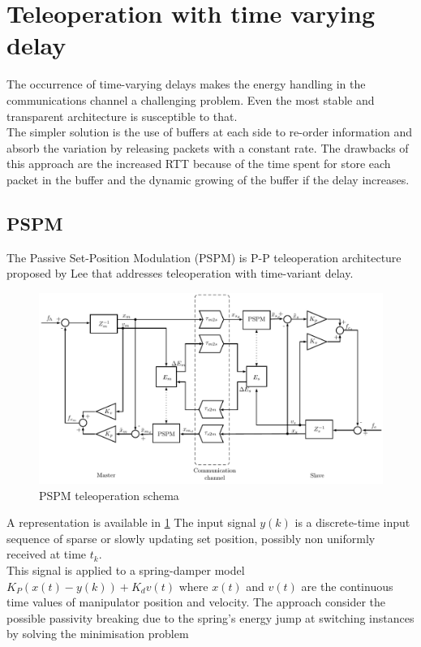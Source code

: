 \section{Teleoperation with time varying delay} 
The occurrence of time-varying delays makes the energy handling in the communications channel a challenging problem.
Even the most stable and transparent architecture is susceptible to that.\\
The simpler solution is the use of buffers at each side to re-order information and absorb the variation by releasing packets with a constant rate.
The drawbacks of this approach are the increased RTT because of the time spent for store each packet in the buffer and the dynamic growing of the buffer if the delay increases.
\subsection{PSPM}\label{PSPM}
The Passive Set-Position Modulation (PSPM) is P-P teleoperation architecture proposed by Lee \cite{Lee2010} that addresses teleoperation with time-variant delay.\\
\begin{figure}
	\includegraphics[width=\textwidth]{schemas/PSPM.pdf}
	\caption[PSPM teleoperation schema]{PSPM teleoperation schema}
	\label{sch:PSPM}
\end{figure}
A representation is available in \figurename{ \ref{sch:PSPM}}
The input signal $y(k)$ is a discrete-time input sequence of sparse or slowly updating set position, possibly non uniformly received at time $t_{k}$. \\
This signal is applied to a spring-damper model $K_{P}\left( x(t) - y(k) \right) + K_{d}v(t)$ where $x(t)$ and $v(t)$ are the continuous time values of manipulator position and velocity.
The approach consider the possible passivity breaking due to the spring's energy jump at switching instances by solving the minimisation problem
